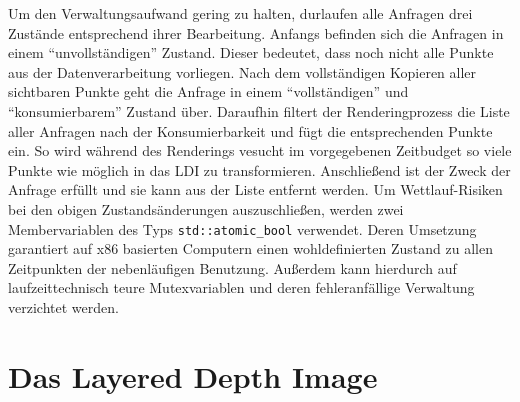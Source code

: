 \documentclass[hyperref, beleg, german]{cgvpub}
\begin{document}
Um den Verwaltungsaufwand gering zu halten, durlaufen alle Anfragen drei
Zustände entsprechend ihrer Bearbeitung. Anfangs befinden sich die Anfragen in
einem ``unvollständigen'' Zustand. Dieser bedeutet, dass noch nicht alle Punkte
aus der Datenverarbeitung vorliegen. Nach dem vollständigen Kopieren aller
sichtbaren Punkte geht die Anfrage in einem ``vollständigen'' und
``konsumierbarem'' Zustand über. Daraufhin filtert der Renderingprozess die
Liste aller Anfragen nach der Konsumierbarkeit und fügt die entsprechenden
Punkte ein. So wird während des Renderings vesucht im vorgegebenen Zeitbudget
so viele Punkte wie möglich in das LDI zu transformieren. Anschließend ist der
Zweck der Anfrage erfüllt und sie kann aus der Liste entfernt werden. Um
Wettlauf-Risiken bei den obigen Zustandsänderungen auszuschließen, werden zwei
Membervariablen des Typs \texttt{std::atomic\_bool} verwendet. Deren Umsetzung
garantiert auf x86 basierten Computern einen wohldefinierten Zustand zu allen
Zeitpunkten der nebenläufigen Benutzung. Außerdem kann hierdurch auf
laufzeittechnisch teure Mutexvariablen und deren fehleranfällige Verwaltung
verzichtet werden.

\section{Das Layered Depth Image}
\end{document}
